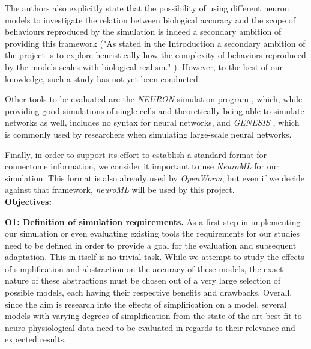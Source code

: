 \documentclass[a4paper,11pt]{article}
\begin{document}
The authors also explicitly state that the possibility of using different neuron models to investigate the relation between biological accuracy and the scope of behaviours reproduced by the simulation is indeed a secondary ambition of providing this framework ("As stated in the Introduction a secondary ambition of the project is to explore heuristically how the complexity of behaviors reproduced by the models scales with biological realism."  \citet{Szigeti2014}). However, to the best of our knowledge, such a study has not yet been conducted.

Other tools to be evaluated are the \emph{NEURON} simulation program \citep{Hines1994}, which, while providing good simulations of single cells and theoretically being able to simulate networks as well, includes no syntax for neural networks, and \emph{GENESIS} \citep{Bower2003}, which is commonly used by researchers when simulating large-scale neural networks. 

Finally, in order to support its effort to establish a standard format for connectome information, we consider it important to use \emph{NeuroML} \citep{Gleeson2010} for our simulation. This format is also already used by \emph{OpenWorm}, but even if we decide against that framework, \emph{neuroML} will be used by this project.
\\[0,2cm]


\textbf{Objectives:}

\textbf{O1: Definition of simulation requirements.}
As a first step in implementing our simulation or even evaluating existing tools the requirements for our studies need to be defined in order to provide a goal for the evaluation and subsequent adaptation. This in itself is no trivial task. While we attempt to study the effects of simplification and abstraction on the accuracy of these models, the exact nature of these abstractions must be chosen out of a very large selection of possible models, each having their respective benefits and drawbacks. 
Overall, since the aim is research into the effects of simplification on a model, several models with varying degrees of simplification from the state-of-the-art best fit to neuro-physiological data need to be evaluated in regards to their relevance and expected results.

\end{document}

